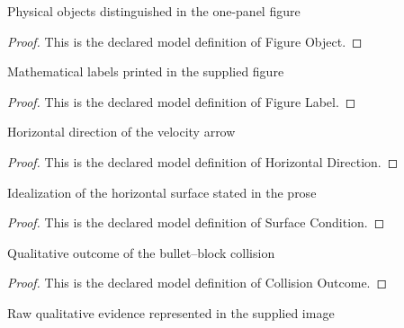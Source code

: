 \begin{definition}
  \label{def:physics:phyx-mini-0260:phyxminiproblems-problemphyxmini0260-figureobject}
  Physical objects distinguished in the one-panel figure
\end{definition}
\begin{proof}
  This is the declared model definition of Figure Object.
\end{proof}
\begin{definition}
  \label{def:physics:phyx-mini-0260:phyxminiproblems-problemphyxmini0260-figurelabel}
  Mathematical labels printed in the supplied figure
\end{definition}
\begin{proof}
  This is the declared model definition of Figure Label.
\end{proof}
\begin{definition}
  \label{def:physics:phyx-mini-0260:phyxminiproblems-problemphyxmini0260-horizontaldirection}
  Horizontal direction of the velocity arrow
\end{definition}
\begin{proof}
  This is the declared model definition of Horizontal Direction.
\end{proof}
\begin{definition}
  \label{def:physics:phyx-mini-0260:phyxminiproblems-problemphyxmini0260-surfacecondition}
  Idealization of the horizontal surface stated in the prose
\end{definition}
\begin{proof}
  This is the declared model definition of Surface Condition.
\end{proof}
\begin{definition}
  \label{def:physics:phyx-mini-0260:phyxminiproblems-problemphyxmini0260-collisionoutcome}
  Qualitative outcome of the bullet--block collision
\end{definition}
\begin{proof}
  This is the declared model definition of Collision Outcome.
\end{proof}
\begin{definition}
  \label{def:physics:phyx-mini-0260:phyxminiproblems-problemphyxmini0260-ballisticspringfigure}
  Raw qualitative evidence represented in the supplied image
\end{definition}
